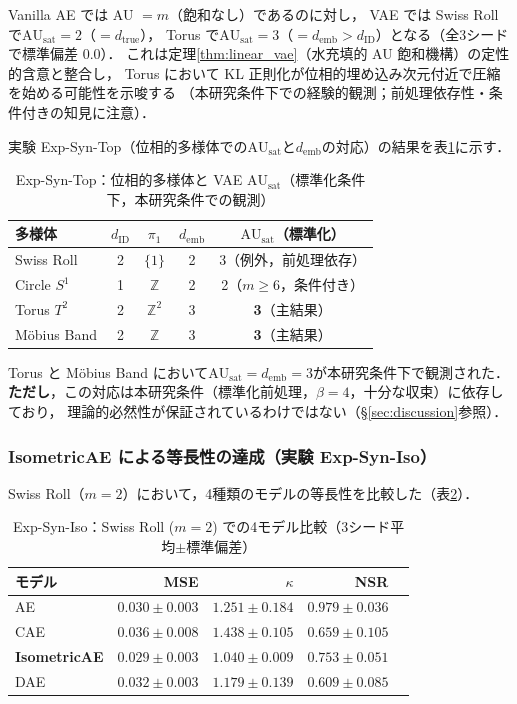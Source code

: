 \documentclass[11pt,a4paper]{jsarticle}
\newcommand{\dID}{d_{\mathrm{ID}}}
\newcommand{\dtrue}{d_{\mathrm{true}}}
\newcommand{\kap}{\kappa}
\newcommand{\AUsat}{\mathrm{AU}_{\mathrm{sat}}}
\newcommand{\demb}{d_{\mathrm{emb}}}
\begin{document}
Vanilla AE では AU $= m$（飽和なし）であるのに対し，
VAE では Swiss Roll で$\AUsat = 2$（$= \dtrue$），
Torus で$\AUsat = 3$（$= \demb > \dID$）となる（全3シードで標準偏差 0.0）．
これは定理\ref{thm:linear_vae}（水充填的 AU 飽和機構）の定性的含意と整合し，
Torus において KL 正則化が位相的埋め込み次元付近で圧縮を始める可能性を示唆する
（本研究条件下での経験的観測；前処理依存性・条件付きの知見に注意）．

実験 Exp-Syn-Top（位相的多様体での$\AUsat$と$\demb$の対応）の結果を表\ref{tab:eb_summary}に示す．

\begin{table}[H]
\centering
\caption{Exp-Syn-Top：位相的多様体と VAE $\AUsat$（標準化条件下，本研究条件での観測）}
\label{tab:eb_summary}
\small
\begin{tabular}{lcccc}
\toprule
多様体 & $\dID$ & $\pi_1$ & $\demb$ & $\AUsat$（標準化） \\
\midrule
Swiss Roll   & 2 & $\{1\}$        & 2 & 3（例外，前処理依存）\\
Circle $S^1$ & 1 & $\mathbb{Z}$   & 2 & 2（$m \geq 6$，条件付き）\\
Torus $T^2$  & 2 & $\mathbb{Z}^2$ & 3 & \textbf{3}（主結果）\\
Möbius Band  & 2 & $\mathbb{Z}$   & 3 & \textbf{3}（主結果）\\
\bottomrule
\end{tabular}
\end{table}

Torus と Möbius Band において$\AUsat = \demb = 3$が本研究条件下で観測された．
\textbf{ただし}，この対応は本研究条件（標準化前処理，$\beta = 4$，十分な収束）に依存しており，
理論的必然性が保証されているわけではない（§\ref{sec:discussion}参照）．

\subsubsection{IsometricAE による等長性の達成（実験 Exp-Syn-Iso）}

Swiss Roll（$m = 2$）において，4種類のモデルの等長性を比較した（表\ref{tab:ec}）．

\begin{table}[H]
\centering
\caption{Exp-Syn-Iso：Swiss Roll ($m=2$) での4モデル比較（3シード平均$\pm$標準偏差）}
\label{tab:ec}
\small
\begin{tabular}{lrrrr}
\toprule
モデル & MSE & $\kap$ & NSR \\
\midrule
AE & $0.030\pm0.003$ & $1.251\pm0.184$ & $0.979\pm0.036$ \\
CAE & $0.036\pm0.008$ & $1.438\pm0.105$ & $0.659\pm0.105$ \\
\textbf{IsometricAE} & $\boldsymbol{0.029\pm0.003}$ & $\boldsymbol{1.040\pm0.009}$ & $0.753\pm0.051$ \\
DAE & $0.032\pm0.003$ & $1.179\pm0.139$ & $0.609\pm0.085$ \\
\bottomrule
\end{tabular}
\end{table}
\end{document}
